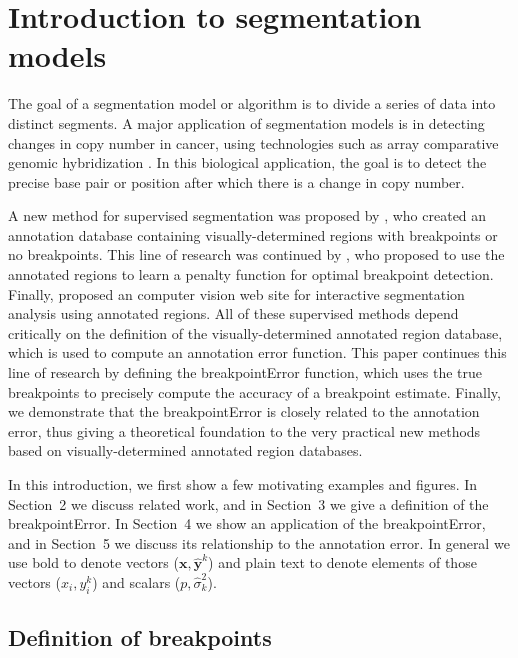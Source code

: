 \documentclass{jsfds} %
\begin{document}
  \begin{AMSclass}
  \end{AMSclass}
 
\newpage

\section{Introduction to segmentation models}

The goal of a segmentation model or algorithm is to divide a series of
data into distinct segments. A major application of segmentation
models is in detecting changes in copy number in cancer, using
technologies such as array comparative genomic hybridization
\citep{PSS98}. In this biological application, the goal is to detect
the precise base pair or position after which there is a change in
copy number.

A new method for supervised segmentation was proposed by
\citet{HOCKING-breakpoints}, who created an annotation database
containing visually-determined regions with breakpoints or no
breakpoints. This line of research was continued by
\citet{HOCKING-penalties}, who proposed to use the annotated regions
to learn a penalty function for optimal breakpoint detection. Finally,
\citet{SegAnnDB} proposed an computer vision web site for interactive
segmentation analysis using annotated regions. All of these supervised
methods depend critically on the definition of the visually-determined
annotated region database, which is used to compute an annotation
error function. This paper continues this line of research by defining
the breakpointError function, which uses the true breakpoints to
precisely compute the accuracy of a breakpoint estimate. Finally, we
demonstrate that the breakpointError is closely related to the
annotation error, thus giving a theoretical foundation to the very
practical new methods based on visually-determined annotated region
databases.

In this introduction, we first show a few motivating examples and
figures. In Section~2 we discuss related work, and in Section~3 we
give a definition of the breakpointError. In Section~4 we show an
application of the breakpointError, and in Section~5 we discuss its
relationship to the annotation error. In general we use bold to denote
vectors ($\mathbf x, \mathbf{\hat y}^k$) and plain text to denote
elements of those vectors ($x_i, y_i^k$) and scalars ($p, \hat
\sigma^2_k$).

\subsection{Definition of breakpoints}
\end{document}
